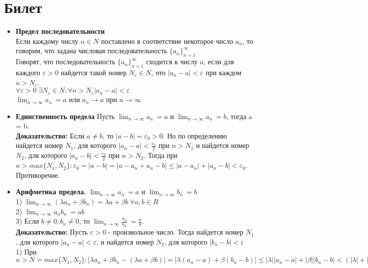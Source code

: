 \documentclass[12pt,a4paper]{article}
\begin{document}
\section{Билет}
\begin{itemize}
    \item \textbf{Предел последовательности} \\
    Если каждому числу $n \in N$ поставлено в соответствие некоторое число $a_n$, то говорим, что задана числовая последовательность $\{a_n\}_{n=1}^{\infty}$ \\
    Говорят, что последовательность $\{a_n\}_{n=1}^{\infty}$ сходится к числу $a$, если для каждого $\varepsilon > 0$ найдется такой номер $N_{\varepsilon} \in N$, что $|a_n - a| < \varepsilon$ при каждом $n > N_{\varepsilon}$. \\
    $\forall \varepsilon > 0 \; \exists N_{\varepsilon} \in N : \forall n> N_{\varepsilon} |a_n - a| < \varepsilon$ \\
    $ \lim_{n\to\infty} a_n \ = a$  или $a_n \to a$ при $n \to \infty$
    \item \textbf{Единственность предела}
    Пусть  $\lim_{n \to \infty} a_n\ = a$ и $\lim_{n \to \infty} a_n\ = b$, тогда a = b. \\
    \textbf{Доказательство:} Если $a \neq b$, то $|a - b| = \varepsilon_0 > 0$. Но по определению найдется номер $N_1$, для которого $|a_n - a| < \frac{\varepsilon_0}{2}$ при $n > N_1$ и найдется номер $N_2$, для которого $|a_n - b| < \frac{\varepsilon_0}{2}$ при $n > N_2$. Тогда при $n > max \{N_1, N_2\} : \varepsilon_0 = |a - b| = |a - a_n + a_n - b| \leq |a - a_n| + |a_n - b| < \varepsilon_0$. Противоречие.
    \item \textbf{Арифметика предела.}
    $\lim_{n \to \infty} a_n\ = a$ и $\lim_{n \to \infty} b_n\ = b$\\
    1) $ \lim_{n \to \infty} (\lambda a_n + \beta b_n) = \lambda a + \beta b \;  \forall a, b \in R $ \\
    2) $\lim_{n \to \infty} a_n b_n\ = ab$\\
    3) Если $b \neq 0, b_n \neq 0$, то $\lim_{n \to \infty} \frac{a_n}{b_n}\ = \frac{a}{b}$. \\
    \textbf{Доказательство:} Пусть $\varepsilon > 0$ - произвольное число. Тогда найдется номер $N_1$, для которого $|a_n - a| < \varepsilon$, и найдется номер $N_2$, для которого $|b_n - b| < \varepsilon$\\
    1) При $n > N = max\{ N_1, N_2 \} : |\lambda a_n + \beta b_n - (\lambda a + \beta b)| = |\lambda(a_n - a) + \beta(b_n - b)| \leq |\lambda| |a_n - a| + |\beta| |b_n - b| < (|\lambda| + |\beta|)\varepsilon$ \\

\end{itemize}
\end{document}
